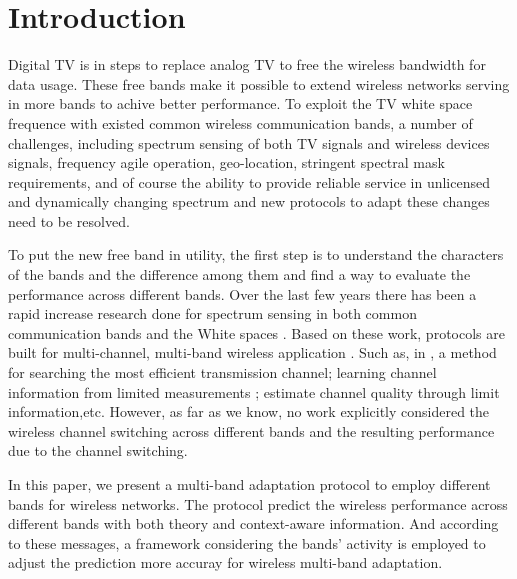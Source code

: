 
\section{Introduction}
\label{sec:introduction}


Digital TV is in steps to replace analog TV to free the wireless bandwidth for data usage. These free bands make it possible to extend wireless networks serving in more bands to achive better performance. To exploit the TV white space frequence with existed common wireless communication bands, a number of challenges, including spectrum sensing of both TV signals and wireless devices signals, frequency agile operation, geo-location, stringent spectral
mask requirements, and of course the ability to provide reliable
service in unlicensed and dynamically changing spectrum \cite{shellhammer2009technical} and new protocols to adapt these changes need to be resolved. 

To put the new free band in utility, the first step is to understand the characters of the bands and the difference among them and find a way to evaluate the performance across different bands.
Over the last few years there has been a rapid increase research done for spectrum sensing in both common communication bands and the White spaces \cite{rayanchu2011fluid, kim1996pulse,cabric2004implementation}. Based on these work, protocols are built for multi-channel, multi-band wireless application \cite{MOAR,raychaudhuri2003spectrum,sabharwal2007opportunistic}.  Such as, in \cite{mo2005comparison}, a method for searching the most efficient transmission channel; learning channel information from limited measurements \cite{rayanchu2011fluid, sabharwal2007opportunistic}; estimate channel quality through limit information\cite{MOAR},etc. However, as far as we know, no work explicitly considered the wireless channel switching across different bands and the resulting performance due to the channel switching.

In this paper, we present a multi-band adaptation protocol to employ different bands for wireless networks.
The protocol predict the wireless performance across different bands with both theory and context-aware information. And according to these messages, a framework considering the bands' activity is employed to adjust the prediction more accuray for wireless multi-band adaptation. 

